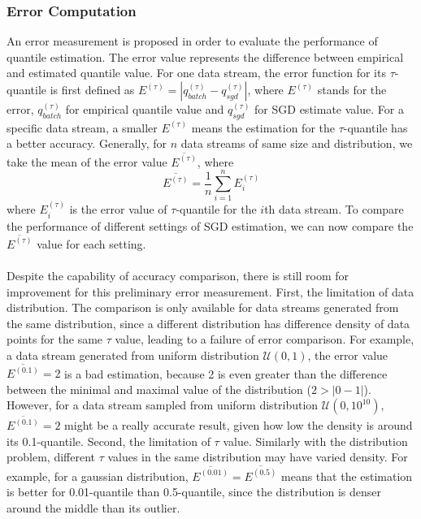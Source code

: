 \documentclass[12pt]{article}
\begin{document}
\subsubsection{Error Computation}

An error measurement is proposed in order to evaluate the performance of quantile estimation. The error value represents the difference between empirical and estimated quantile value. For one data stream, the error function for its $\tau$-quantile is first defined as $E^{(\tau)} = | q_{batch}^{(\tau)} - q_{sgd}^{(\tau)} |$, where $E^{(\tau)}$ stands for the error, $q_{batch}^{(\tau)}$ for empirical quantile value and $q_{sgd}^{(\tau)}$ for SGD estimate value. For a specific data stream, a smaller $E^{(\tau)}$ means the estimation for the $\tau$-quantile has a better accuracy. Generally, for $n$ data streams of same size and distribution, we take the mean of the error value $\overline{E^{(\tau)}}$, where 
    $$
        \overline{E^{(\tau)}} = \frac{1}{n}\sum_{i=1}^{n} E^{(\tau)}_{i}
    $$
where $E^{(\tau)}_{i}$ is the error value of $\tau$-quantile for the $i$th data stream. To compare the performance of different settings of SGD estimation, we can now compare the $\overline{E^{(\tau)}}$ value for each setting.
\\\\
 Despite the capability of accuracy comparison, there is still room for improvement for this preliminary error measurement. 
 First, the limitation of data distribution. The comparison is only available for data streams generated from the same distribution, since a different distribution has difference density of data points for the same $\tau$ value, leading to a failure of error comparison. For example, a data stream generated from uniform distribution $\mathcal{U}(0,1)$, the error value $\overline{E^{(0.1)}} = 2$ is a bad estimation, because 2 is even greater than the difference between the minimal and maximal value of the distribution ($2 > |0-1|$). However, for a data stream sampled from uniform distribution $\mathcal{U}(0,10^{10})$, $\overline{E^{(0.1)}} = 2$ might be a really accurate result, given how low the density is around its 0.1-quantile. 
 Second, the limitation of $\tau$ value. Similarly with the distribution problem, different $\tau$ values in the same distribution may have varied density. For example, for a gaussian distribution, $\overline{E^{(0.01)}} = \overline{E^{(0.5)}}$ means that the estimation is better for 0.01-quantile than 0.5-quantile, since the distribution is denser around the middle than its outlier.
\end{document}
